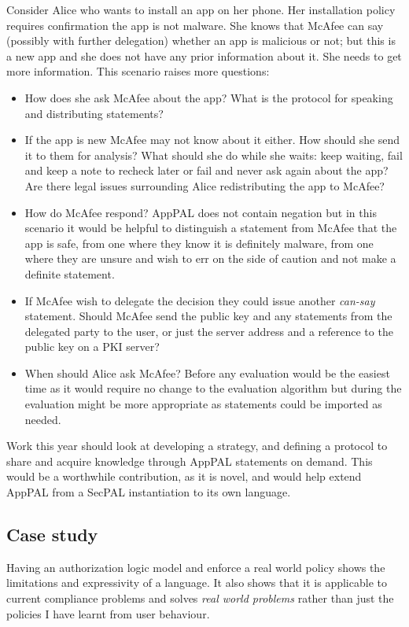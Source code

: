 \documentclass[a4paper]{scrartcl}
\begin{document}
Consider Alice who wants to install an app on her phone.
Her installation policy requires confirmation the app is not malware.
She knows that McAfee can say (possibly with further delegation) whether an app is malicious or not;
  but this is a new app and she does not have any prior information about it.
She needs to get more information.
This scenario raises more questions:

\begin{itemize}
  \item How does she ask McAfee about the app?  What is the protocol for speaking and distributing statements?
  \item If the app is new McAfee may not know about it either. How should she send it to them for analysis?  What should she do while she waits: keep waiting, fail and keep a note to recheck later or fail and never ask again about the app?  Are there legal issues surrounding Alice redistributing the app to McAfee?
  \item How do McAfee respond?  AppPAL does not contain negation but in this scenario it would be helpful to distinguish a statement from McAfee that the app is safe, from one where they know it is definitely malware, from one where they are unsure and wish to err on the side of caution and not make a definite statement.
  \item If McAfee wish to delegate the decision they could issue another \emph{can-say} statement.   Should McAfee send the public key and any statements from the delegated party to the user, or just the server address and a reference to the public key on a PKI server?
  \item When should Alice ask McAfee?  Before any evaluation would be the easiest time as it would require no change to the evaluation algorithm but during the evaluation might be more appropriate as statements could be imported as needed.
\end{itemize}

Work this year should look at developing a strategy, and defining a protocol to share and acquire knowledge through AppPAL statements on demand.
This would be a worthwhile contribution, as it is novel, and would help extend AppPAL from a SecPAL instantiation to its own language.


\subsection{Case study}

Having an authorization logic model and enforce a real world policy shows the limitations and expressivity of a language.
It also shows that it is applicable to current compliance problems and solves \emph{real world problems} rather than just the policies I have learnt from user behaviour.
\end{document}
